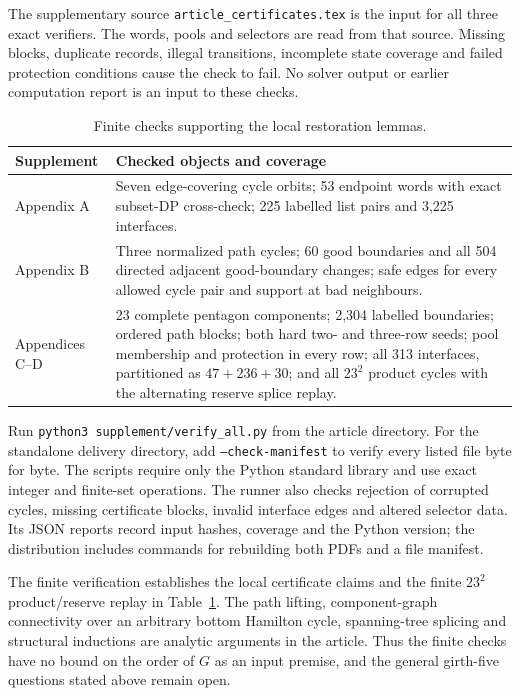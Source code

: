 \documentclass[11pt]{article}
\theoremstyle{remark}
\numberwithin{equation}{section}
\numberwithin{table}{section}
\begin{document}
The supplementary source \texttt{article\_certificates.tex} is the input
for all three exact verifiers. The words, pools and selectors are read
from that source. Missing blocks, duplicate records, illegal transitions,
incomplete state coverage and failed protection conditions cause the
check to fail. No solver output or earlier computation report is an
input to these checks.

\begin{table}[htbp]
\centering\small
\caption{Finite checks supporting the local restoration lemmas.}
\label{tab:verification}
\begin{tabularx}{\linewidth}{@{}lX@{}}
\toprule
Supplement & Checked objects and coverage\\
\midrule
Appendix A & Seven edge-covering cycle orbits; 53 endpoint words with
exact subset-DP cross-check; 225 labelled list pairs and 3,225 interfaces.\\
Appendix B & Three normalized path cycles; 60 good boundaries and all
504 directed adjacent good-boundary changes; safe edges for every
allowed cycle pair and support at bad neighbours.\\
Appendices C--D & 23 complete pentagon components; 2,304 labelled
boundaries; ordered path blocks; both hard two- and three-row seeds;
pool membership and protection in every row; all 313 interfaces,
partitioned as $47+236+30$; and all $23^2$ product cycles with the
alternating reserve splice replay.\\
\bottomrule
\end{tabularx}
\end{table}

Run \texttt{python3 supplement/verify\_all.py} from the article directory.
For the standalone delivery directory, add
\texttt{--check-manifest} to verify every listed file byte for byte.
The scripts require only the Python standard library and use exact
integer and finite-set operations. The runner also checks rejection
of corrupted cycles, missing certificate blocks, invalid interface
edges and altered selector data. Its JSON reports record input hashes,
coverage and the Python version; the distribution includes commands
for rebuilding both PDFs and a file manifest.

The finite verification establishes the local certificate claims and the
finite $23^2$ product/reserve replay in Table~\ref{tab:verification}.
The path lifting, component-graph connectivity over an arbitrary bottom
Hamilton cycle, spanning-tree splicing and structural inductions are
analytic arguments in the article. Thus the finite checks have no bound
on the order of $G$ as an input premise, and the general girth-five
questions stated above remain open.
\end{document}
